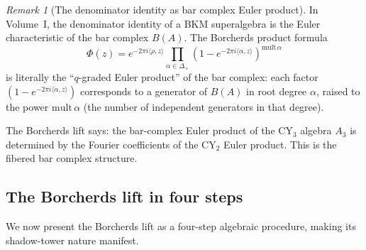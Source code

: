 \documentclass[11pt]{article}
\theoremstyle{plain}
\theoremstyle{definition}
\theoremstyle{remark}
\newtheorem{remark}[theorem]{Remark}
\newcommand{\CY}{\mathrm{CY}}
\begin{document}
\begin{remark}[The denominator identity as bar complex Euler product]
\label{rmk:denom-bar-euler}
In Volume~I, the denominator identity of a BKM superalgebra is the Euler characteristic of the bar complex $B(A)$. The Borcherds product formula
\[
 \Phi(z) = e^{-2\pi i \langle \rho, z \rangle}
 \prod_{\alpha \in \Delta_+} (1 - e^{-2\pi i \langle \alpha, z \rangle})^{\mathrm{mult}\, \alpha}
\]
is literally the ``$q$-graded Euler product'' of the bar complex: each factor
$(1 - e^{-2\pi i \langle \alpha, z \rangle})$ corresponds to a generator of
$B(A)$ in root degree $\alpha$, raised to the power $\mathrm{mult}\, \alpha$
(the number of independent generators in that degree).

The Borcherds lift says: the bar-complex Euler product of the $\CY_3$ algebra $A_3$ is determined by the Fourier coefficients of the $\CY_2$ Euler product. This is the fibered bar complex structure.
\end{remark}

\subsection{The Borcherds lift in four steps}
\label{subsec:borcherds-four-steps}

We now present the Borcherds lift as a four-step algebraic procedure, making its shadow-tower nature manifest.
\end{document}
